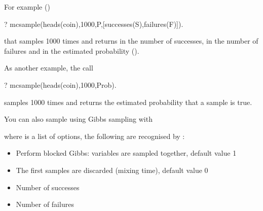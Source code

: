 \documentclass[letterpaper,10pt,english]{sphinxmanual}
\begin{document}
For example ()

\begin{sphinxVerbatim}[commandchars=\\\{\}]
?\PYGZhy{} mc\PYGZus{}sample(heads(coin),1000,P,[successes(S),failures(F)]).
\end{sphinxVerbatim}

that samples  1000 times and returns in  the number of successes, in  the number of failures and in  the estimated probability ().

As another example, the call

\begin{sphinxVerbatim}[commandchars=\\\{\}]
?\PYGZhy{} mc\PYGZus{}sample(heads(coin),1000,Prob).
\end{sphinxVerbatim}

samples  1000 times and returns the estimated probability that a sample is true.

You can also sample using Gibbs sampling with

\begin{sphinxVerbatim}[commandchars=\\\{\}]
  
\end{sphinxVerbatim}

where  is a list of options, the following are recognised by :
\begin{itemize}
\item {} 
 Perform blocked Gibbs:  variables are sampled together, default value 1

\item {} 
 The first  samples are discarded (mixing time), default value 0

\item {} 
 Number of successes

\item {} 
 Number of failures

\end{itemize}
\end{document}
